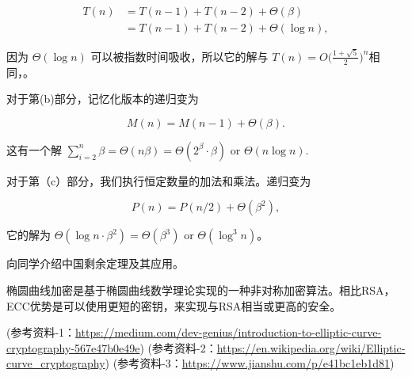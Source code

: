 \documentclass[a4paper, justified]{tufte-handout}
\begin{document}
\begin{solution}
  $$ \begin{aligned} T(n) & = T(n - 1) + T(n - 2) + \Theta(\beta) \\ & = T(n - 1) + T(n - 2) + \Theta(\log n), \end{aligned} $$

  因为 $\Theta(\log n)$ 可以被指数时间吸收，所以它的解与 $T(n) = O\Big(\frac{1 + \sqrt 5}{2}\Big)^n$相同，。

  对于第(b)部分，记忆化版本的递归变为

  $$M(n) = M(n - 1) + \Theta(\beta).$$

  这有一个解 $\sum_{i = 2}^n \beta = \Theta(n\beta) = \Theta(2^\beta \cdot \beta)$ or $\Theta(n \log n)$.

  对于第（c）部分，我们执行恒定数量的加法和乘法。递归变为

  $$P(n) = P(n / 2) + \Theta(\beta^2),$$

  它的解为 $\Theta(\log n \cdot \beta^2) = \Theta(\beta^3)$ or $\Theta(\log^3 n)$。
\end{solution}

\beginoptional

\begin{problem}[TC Problem 31-4]
\end{problem}

\begin{solution}
\end{solution}


\beginot
\begin{ot}[中国剩余定理]
  向同学介绍中国剩余定理及其应用。
\end{ot}


\begin{ot}
  椭圆曲线加密是基于椭圆曲线数学理论实现的一种非对称加密算法。相比RSA，ECC优势是可以使用更短的密钥，来实现与RSA相当或更高的安全。

  (参考资料-1：\href{https://medium.com/dev-genius/introduction-to-elliptic-curve-cryptography-567e47b0e49e}{https://medium.com/dev-genius/introduction-to-elliptic-curve-cryptography-567e47b0e49e})
  (参考资料-2：\href{https://en.wikipedia.org/wiki/Elliptic-curve_cryptography}{https://en.wikipedia.org/wiki/Elliptic-curve\_cryptography})
  (参考资料-3：\href{https://www.jianshu.com/p/e41bc1eb1d81}{https://www.jianshu.com/p/e41bc1eb1d81})
\end{ot}
\end{document}
